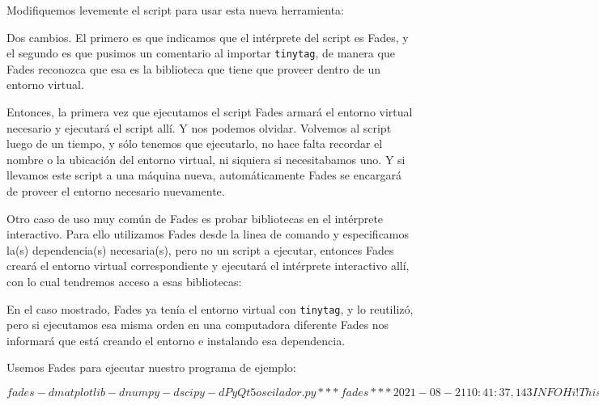 Modifiquemos levemente el script para usar esta nueva herramienta:


Dos cambios. El primero es que indicamos que el intérprete del script es Fades, y el segundo es que pusimos un comentario al importar \texttt{tinytag}, de manera que Fades reconozca que esa es la biblioteca que tiene que proveer dentro de un entorno virtual.

Entonces, la primera vez que ejecutamos el script Fades armará el entorno virtual necesario y ejecutará el script allí. Y nos podemos olvidar. Volvemos al script luego de un tiempo, y sólo tenemos que ejecutarlo, no hace falta recordar el nombre o la ubicación del entorno virtual, ni siquiera si necesitabamos uno. Y si llevamos este script a una máquina nueva, automáticamente Fades se encargará de proveer el entorno necesario nuevamente.

Otro caso de uso muy común de Fades es probar bibliotecas en el intérprete interactivo. Para ello utilizamos Fades desde la linea de comando y especificamos la(s) dependencia(s) necesaria(s), pero no un script a ejecutar, entonces Fades creará el entorno virtual correspondiente y ejecutará el intérprete interactivo allí, con lo cual tendremos acceso a esas bibliotecas:


En el caso mostrado, Fades ya tenía el entorno virtual con \texttt{tinytag}, y lo reutilizó, pero si ejecutamos esa misma orden en una computadora diferente Fades nos informará que está creando el entorno e instalando esa dependencia.

Usemos Fades para ejecutar nuestro programa de ejemplo:

\begin{shell}
[/temp]$ fades -d matplotlib -d numpy -d scipy -d PyQt5 oscilador.py 
*** fades ***  2021-08-21 10:41:37,143  INFO     Hi! This is fades 9.0.1, automatically managing your dependencies
*** fades ***  2021-08-21 10:41:37,143  INFO     Checking the availabilty of dependencies in PyPI. You can use '--no-precheck-availability' to avoid it.
*** fades ***  2021-08-21 10:41:41,115  INFO     Installing dependency: 'PyQt5'
*** fades ***  2021-08-21 10:41:44,816  INFO     Installing dependency: 'numpy'
*** fades ***  2021-08-21 10:41:47,650  INFO     Installing dependency: 'scipy'
*** fades ***  2021-08-21 10:41:51,216  INFO     Installing dependency: 'matplotlib'
Opciones del script: Namespace(archivo=None, usar_tex=False)
Ejecutando con parámetros: a=17 b=1 λ=15.4 µ=0.75
Config de matplotlib: {'font.size': 14, 'axes.labelsize': 'large'}
[/temp]$ 
\end{shell}

